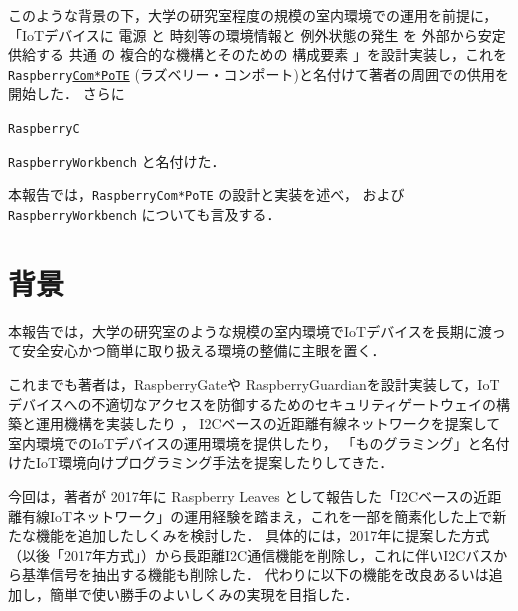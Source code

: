 このような背景の下，大学の研究室程度の規模の室内環境での運用を前提に，
「IoTデバイスに
電源 と
時刻等の環境情報と
例外状態の発生 を
外部から安定供給する
共通 の
複合的な機構とそのための
構成要素
」を設計実装し，これを
{\tt Raspberry\underline{Com*PoTE}}
(ラズベリー・コンポート)と名付けて著者の周囲での供用を開始した．
さらに {\tt Raspberry\-C


{\tt RaspberryWorkbench}
と名付けた．

本報告では，{\tt Raspberry\-Com*PoTE} の設計と実装を述べ，
および {\tt Raspberry\-Workbench} についても言及する．


\section{背景}
\label{sec:02background}

本報告では，大学の研究室のような規模の室内環境でIoTデバイスを長期に渡って安全安心かつ簡単に取り扱える環境の整備に主眼を置く．

これまでも著者は，RaspberryGateや RaspberryGuardianを設計実装して，IoTデバイスへの不適切なアクセスを防御するためのセキュリティゲートウェイの構築と運用機構を実装したり\cite{hohno:RaspberryGate}\cite{hohno:RaspberryGuardian} ，
I2Cベースの近距離有線ネットワークを提案して室内環境でのIoTデバイスの運用環境を提供したり\cite{hohno:I2CwiredLAN-2017}，
「ものグラミング」と名付けたIoT環境向けプログラミング手法を提案したりしてきた\cite{hohno:monogramming2}．

今回は，著者が 2017年に Raspberry Leaves として報告した「I2Cベースの近距離有線IoTネットワーク」の運用経験を踏まえ，これを一部を簡素化した上で新たな機能を追加したしくみを検討した．
具体的には，2017年に提案した方式（以後「2017年方式」）から長距離I2C通信機能を削除し，これに伴いI2Cバスから基準信号を抽出する機能も削除した．
代わりに以下の機能を改良あるいは追加し，簡単で使い勝手のよいしくみの実現を目指した．

}
